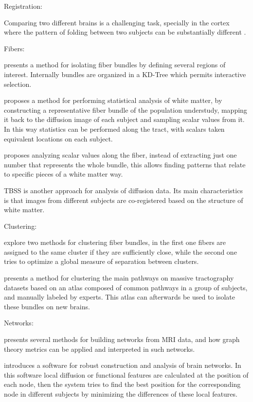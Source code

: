 Registration:

Comparing two different brains is a challenging task, specially in the cortex where the pattern of folding between two subjects can be substantially different \autocite{toga_new_2002}.


Fibers:

\autocite{blaas_fast_2005} presents a method for isolating fiber bundles by defining several regions of interest. Internally bundles are organized in a KD-Tree which permits interactive selection.

\autocite{goodlett_group_2008} proposes a method for performing statistical analysis of white matter, by constructing a representative fiber bundle of the population understudy, mapping it back to the diffusion image of each subject and sampling scalar values from it. In this way statistics can be performed along the tract, with scalars taken equivalent locations on each subject.

\autocite{colby_along-tract_2011} proposes analyzing scalar values along the fiber, instead of extracting just one number that represents the whole bundle, this allows finding patterns that relate to specific pieces of a white matter way.

TBSS \autocite{smith_tract-based_2006} is another approach for analysis of diffusion data. Its main characteristics is that images from different subjects are co-registered based on the structure of white matter. 

Clustering:

\autocite{song_zhang_identifying_2008} explore two methods for clustering fiber bundles, in the first one fibers are assigned to the same cluster if they are sufficiently close, while the second one tries to optimize a global measure of separation between clusters.

\autocite{guevara_automatic_2012} presents a method for clustering the main pathways on massive tractography datasets based on an atlas composed of common pathways in a group of subjects, and manually labeled by experts. This atlas can afterwards be used to isolate these bundles on new brains.

Networks:

\autocite{rubinov_complex_2010} presents several methods for building networks from MRI data, and how graph theory metrics can be applied and interpreted in such networks.

\autocite{li_visual_2012} introduces a software for robust construction and analysis of brain networks. In this software local diffusion or functional features are calculated at the position of each node, then the system tries to find the best position for the corresponding node in different subjects by minimizing the differences of these local features.

